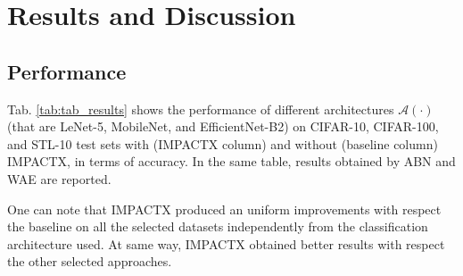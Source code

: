 \section{Results and Discussion}
\label{sec:res}


\subsection{Performance}
Tab. \ref{tab:tab_results} shows the performance of different architectures $\mathcal{A}(\cdot)$ (that are LeNet-5, MobileNet, and EfficientNet-B2) on CIFAR-10, CIFAR-100, and STL-10 test sets with (IMPACTX column) and without (baseline column) IMPACTX, in terms of accuracy. In the same table, results obtained by ABN and WAE are reported. 



One can note that IMPACTX produced an uniform improvements with respect the baseline on all the selected datasets independently from the classification architecture used. At same way, IMPACTX obtained better results with respect the other selected approaches. 







